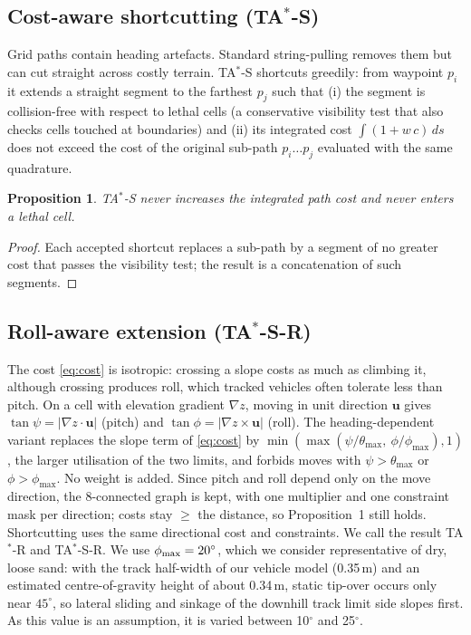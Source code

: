 \documentclass[conference]{IEEEtran}
\newtheorem{proposition}{Proposition}
\newcommand{\TAS}{TA$^*$-S}
\newcommand{\TA}{TA$^*$}
\newcommand{\thmax}{\theta_{\max}}
\begin{document}
\subsection{Cost-aware shortcutting (\TAS)}
Grid paths contain heading artefacts. Standard string-pulling removes them
but can cut straight across costly terrain. \TAS{} shortcuts greedily: from
waypoint $p_i$ it extends a straight segment to the farthest $p_j$ such that
(i) the segment is collision-free with respect to lethal cells (a conservative
visibility test that also checks cells touched at boundaries) and (ii) its
integrated cost $\int(1+w\,c)\,ds$ does not exceed the cost of the original
sub-path $p_i\ldots p_j$ evaluated with the same quadrature.
\begin{proposition}
\TAS{} never increases the integrated path cost and never enters a lethal cell.
\end{proposition}
\begin{proof}
Each accepted shortcut replaces a sub-path by a segment of no greater cost
that passes the visibility test; the result is a concatenation of such
segments.
\end{proof}

\subsection{Roll-aware extension (\TAS-R)}\label{sec:roll}
The cost \eqref{eq:cost} is isotropic: crossing a slope costs as much as
climbing it, although crossing produces roll, which tracked vehicles often
tolerate less than pitch. On a cell with elevation gradient $\nabla z$, moving
in unit direction $\mathbf u$ gives $\tan\psi=|\nabla z\cdot\mathbf u|$ (pitch)
and $\tan\phi=|\nabla z\times\mathbf u|$ (roll). The heading-dependent variant
replaces the slope term of \eqref{eq:cost} by
$\min(\max(\psi/\thmax,\ \phi/\phi_{\max}),1)$, the larger utilisation of the
two limits, and forbids moves with $\psi>\thmax$ or $\phi>\phi_{\max}$. No
weight is added. Since pitch and roll depend only on the move direction, the
8-connected graph is kept, with one multiplier and one constraint mask per
direction; costs stay $\ge$ the distance, so Proposition~1 still holds.
Shortcutting uses the same directional cost and constraints. We call the
result \TA-R and \TAS-R. We use $\phi_{\max}=20^\circ$, which we consider
representative of dry, loose sand: with the track half-width of our vehicle
model (0.35\,m) and an estimated centre-of-gravity height of about 0.34\,m,
static tip-over occurs only near $45^\circ$, so lateral sliding and sinkage of
the downhill track limit side slopes first. As this value is an assumption, it
is varied between 10$^\circ$ and 25$^\circ$.
\end{document}
